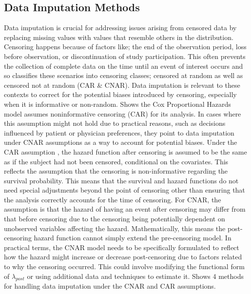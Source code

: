 \subsection{Data Imputation Methods} \label{impute}
Data imputation is crucial for addressing issues arising from censored data by replacing missing values with values that resemble others in the distribution. Censoring happens because of factors like; the end of the observation period, loss before observation, or discontinuation of study participation. This often prevents the collection of complete data on the time until an event of interest occurs and so \parencite{jin_imputation_2024} classifies these scenarios into censoring classes; censored at random as well as censored not at random (CAR \& CNAR). Data imputation is relevant to these contexts to correct for the potential biases introduced by censoring, especially when it is informative or non-random. \parencite{jin_imputation_2024} Shows the Cox Proportional Hazards model assumes noninformative censoring (CAR) for its analysis. In cases where this assumption might not hold due to practical reasons, such as decisions influenced by patient or physician preferences, they point to data imputation under CNAR assumptions as a way to account for potential biases. Under the CAR assumption \parencite{jin_imputation_2024}, the hazard function after censoring is assumed to be the same as if the subject had not been censored, conditional on the covariates. This reflects the assumption that the censoring is non-informative regarding the survival probability. This means that the survival and hazard functions do not need special adjustments beyond the point of censoring other than ensuring that the analysis correctly accounts for the time of censoring. For CNAR, \parencite{jin_imputation_2024} the assumption is that the hazard of having an event after censoring may differ from that before censoring due to the censoring being potentially dependent on unobserved variables affecting the hazard. Mathematically, this means the post-censoring hazard function cannot simply extend the pre-censoring model. In practical terms, the CNAR model needs to be specifically formulated to reflect how the hazard might increase or decrease post-censoring due to factors related to why the censoring occurred. This could involve modifying the functional form of \(\lambda_{post}\) or using additional data and techniques to estimate it. \parencite{jin_imputation_2024} Shows 4 methods for handling data imputation under the CNAR and CAR assumptions.

